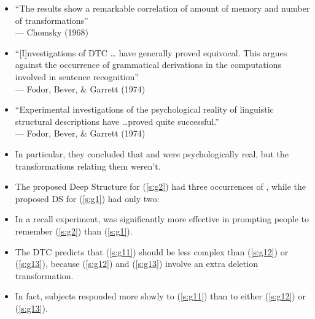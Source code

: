 \documentclass[a4paper,landscape,headrule,footrule]{foils}
\begin{document}
\begin{itemize}
\item ``The results show a remarkable correlation of 
amount of memory and number of transformations'' 
\\ \mbox{} \hfill ---  Chomsky (1968)
\item ``[I]nvestigations of DTC \ldots{} have generally proved 
equivocal.  This argues against the occurrence of 
grammatical derivations in the computations 
involved in sentence recognition''                              
\\ \mbox{} \hfill --- Fodor, Bever, \& Garrett (1974)
\end{itemize}



\begin{itemize}
\item ``Experimental investigations of the 
psychological reality of linguistic structural 
descriptions have \ldots proved quite successful.''                                        
\\ \mbox{} \hfill --- Fodor, Bever, \& Garrett (1974)
\item In particular, they concluded that  and  were 
psychologically real, but the transformations 
relating them weren’t.
\end{itemize}



\begin{itemize}
\item The proposed Deep Structure for (\ref{s:g2}) had three
  occurrences of , while the proposed DS for (\ref{s:g1})
  had only two:
\begin{exe}
  \ex \label{s:g1} 
  \ex \label{s:g2} 
\end{exe}
\item In a recall experiment,  was significantly more 
effective in prompting people to remember (\ref{s:g2}) than (\ref{s:g1}). 
\end{itemize}

\begin{exe}
  \ex \label{s:g11} 
  \ex \label{s:g12} 
  \ex \label{s:g13} 
\end{exe}
\begin{itemize}
\item The DTC predicts that (\ref{s:g11}) should be less complex than
  (\ref{s:g12}) or (\ref{s:g13}), because (\ref{s:g12}) and
  (\ref{s:g13}) involve an extra deletion transformation.
\item In fact, subjects responded more slowly to (\ref{s:g11}) than to 
either (\ref{s:g12}) or (\ref{s:g13}).
\end{itemize}
\end{document}
